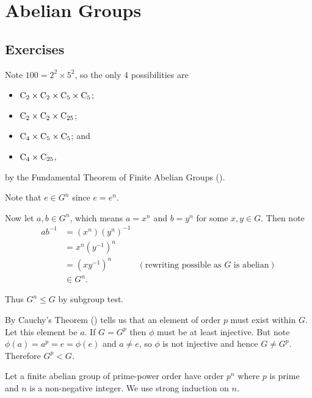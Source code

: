 \section{Abelian Groups}
\subsection*{Exercises}
\begin{questions}
    \item Note $100 = 2^2 \times 5^2$, so the only 4 possibilities are
    \begin{itemize}
        \item $\mathrm{C}_{2} \times \mathrm{C}_{2} \times \mathrm{C}_{5} \times \mathrm{C}_{5}$;
        \item $\mathrm{C}_{2} \times \mathrm{C}_{2} \times \mathrm{C}_{25}$;
        \item $\mathrm{C}_{4} \times \mathrm{C}_{5} \times \mathrm{C}_{5}$; and
        \item $\mathrm{C}_{4} \times \mathrm{C}_{25}$,
    \end{itemize}
    by the Fundamental Theorem of Finite Abelian Groups ().

    \item \begin{partquestions}{\roman*}
        \item Note that $e \in G^n$ since $e = e^n$.

        Now let $a, b \in G^n$, which means $a = x^n$ and $b = y^n$ for some $x, y \in G$. Then note
        \begin{align*}
            ab^{-1} &= (x^n)(y^n)^{-1}\\
            &= x^n(y^{-1})^n\\
            &= (xy^{-1})^n & (\text{rewriting possible as }G \text{ is abelian})\\
            &\in G^n.
        \end{align*}

        Thus $G^n \leq G$ by subgroup test.

        \item By Cauchy's Theorem () tells us that an element of order $p$ must exist within $G$. Let this element be $a$. If $G = G^p$ then $\phi$ must be at least injective. But note $\phi(a) = a^p = e = \phi(e)$ and $a \neq e$, so $\phi$ is not injective and hence $G \neq G^p$. Therefore $G^p < G$.
    \end{partquestions}

    \item Let a finite abelian group of prime-power order have order $p^n$ where $p$ is prime and $n$ is a non-negative integer. We use strong induction on $n$.


\end{questions}
